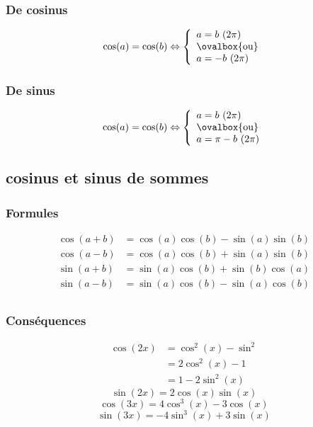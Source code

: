 \documentclass[12pt,a4paper,french]{book}
\begin{document}
			\subsubsection{De cosinus}
				\begin{equation*}
					\cos(a)=\cos(b) \Leftrightarrow \left\lbrace \begin{array}{ll} a = b \ (2\pi) \\ \mbox{\ovalbox{ou}} \\ a = -b  \ (2\pi) \end{array} \right.
				\end{equation*}
			\subsubsection{De sinus}
			\begin{equation*}
				\cos(a)=\cos(b) \Leftrightarrow \left\lbrace \begin{array}{ll} a = b \ (2\pi) \\ \mbox{\ovalbox{ou}}\\ a = \pi -b  \ (2\pi) \end{array} \right.
			\end{equation*}
		\subsection{cosinus et sinus de sommes}
			\subsubsection{Formules}
				\begin{align*}
					\cos(a+b) &= \cos(a)\cos(b) - \sin(a)\sin(b)	\\
					\cos(a-b) &= \cos(a)\cos(b) + \sin(a)\sin(b)	\\
					\sin(a+b) &=\sin(a)\cos(b) + \sin(b)\cos(a)	\\
					\sin(a-b) &=\sin(a)\cos(b) - \sin(a)\cos(b)	\\
				\end{align*}
			\subsubsection{Conséquences}
				\begin{equation*}
					\begin{split} \cos(2x) &= \cos^{2}(x) - \sin^{2} \\
						&= 2\cos^{2}(x) - 1 \\ &= 1 - 2\sin^{2}(x)
				\end{split}
				\end{equation*}
				\[	\sin(2x) = 2\cos(x)\sin(x)\]
				\[\cos(3x) = 4\cos^{3}(x)-3\cos(x) \]
				\[\sin(3x) = -4\sin^{3}(x)+3\sin(x)\]
\end{document}
